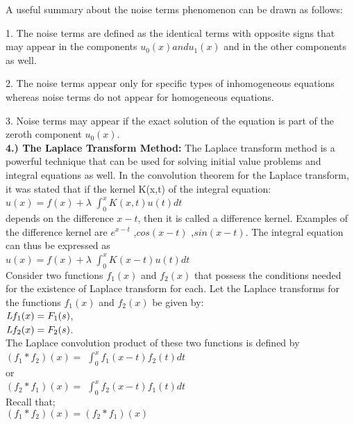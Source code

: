 \documentclass[12pt]{article}
\begin{document}
A useful summary about the noise terms phenomenon can be drawn as follows:\\
\par 1. The noise terms are deﬁned as the identical terms with opposite signs that may appear in the components $u_0(x) and u_1(x)$ and in the other components as well.
\par 2. The noise terms appear only for speciﬁc types of inhomogeneous equations whereas noise terms do not appear for homogeneous equations.
\par 3. Noise terms may appear if the exact solution of the equation is part of the zeroth component $u_0(x)$. \\
\textbf{4.)		The Laplace Transform Method:}
The Laplace transform method is a powerful technique that can be used for solving initial value problems and integral equations as well. In the convolution theorem for the Laplace transform, it was stated that if the kernel K(x,t) of the integral equation: \\

$u(x) = f(x) + \lambda$ \(\int_{0}^{x} K(x,t) u(t) dt\)\\

depends on the difference $x−t$, then it is called a difference kernel. Examples of the difference kernel are $e^{x-t}$ ,$cos(x - t)$ ,$sin(x - t)$. The integral equation can thus be expressed as \\

$u(x) = f(x) + \lambda$ \(\int_{0}^{x} K(x - t) u(t) dt\)\\

Consider two functions $f_1(x)$ and $f_2(x)$ that possess the conditions needed for the existence of Laplace transform for each. Let the Laplace transforms for the functions $f_1(x)$ and $f_2(x)$ be given by: \\

$\emph{L}{f_1(x)} = F_1(s)$,\\
$\emph{L}{f_2(x)} = F_2(s)$.\\
The Laplace convolution product of these two functions is deﬁned by \\

$(f_1 * f_2)(x) =$ \(\int_{0}^{x} f_1(x - t) f_2(t) dt\)\\
or\\
$(f_2 * f_1)(x) =$ \(\int_{0}^{x} f_2(x - t) f_1(t) dt\)\\
Recall that;\\
$(f_1 * f_2)(x) = (f_2 * f_1)(x)$\\
\end{document}
